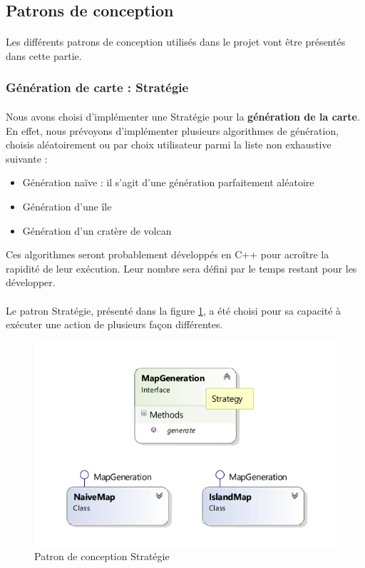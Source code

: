 \subsection{Patrons de conception}

\paragraph{}
Les différents patrons de conception utilisés dans le projet vont être présentés dans cette partie.

\subsubsection{Génération de carte : Stratégie}

\paragraph{}
Nous avons choisi d'implémenter une Stratégie pour la \textbf{génération de la carte}.
En effet, nous prévoyons d'implémenter plusieurs algorithmes de génération, choisis aléatoirement ou par choix utilisateur parmi la liste non exhaustive suivante :

\begin{itemize}
  \item Génération naïve : il s'agit d'une génération parfaitement aléatoire
  \item Génération d'une île
  \item Génération d'un cratère de volcan
\end{itemize}

Ces algorithmes seront probablement développés en C++ pour acroître la rapidité de leur exécution.
Leur nombre sera défini par le temps restant pour les développer.

\paragraph{}
Le patron Stratégie, présenté dans la figure \ref{fig:strategy}, a été choisi pour sa capacité à exécuter une action de plusieurs façon différentes.

\begin{figure}[h]
  \centering
  \includegraphics[width=13cm]{schemas/dp_strategy.png}
  \caption{Patron de conception Stratégie}
  \label{fig:strategy}
\end{figure}

